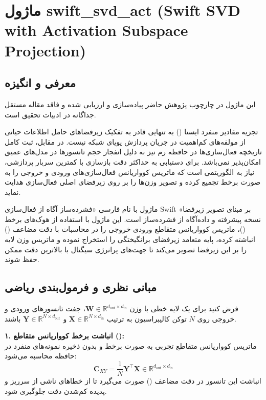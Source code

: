 \section{ماژول swift\_svd\_act (Swift SVD with Activation Subspace Projection)}
\label{sec:module_swift_svd_act}

\subsection{معرفی و انگیزه}
این ماژول در چارچوب پژوهش حاضر پیاده‌سازی و ارزیابی شده و فاقد مقاله مستقل جداگانه در ادبیات تحقیق است.

تجزیه مقادیر منفرد ایستا () به تنهایی قادر به تفکیک زیرفضاهای حامل اطلاعات حیاتی از مولفه‌های کم‌اهمیت در جریان پردازش پویای شبکه نیست. در مقابل، ثبت کامل تاریخچه فعال‌سازی‌ها در حافظه رم نیز به دلیل انفجار حجم تانسورها در مدل‌های عمیق امکان‌پذیر نمی‌باشد. برای دستیابی به حداکثر دقت بازسازی با کمترین سربار پردازشی، نیاز به الگوریتمی است که ماتریس کوواریانس فعال‌سازی‌های ورودی و خروجی را به صورت برخط تجمیع کرده و تصویر وزن‌ها را بر روی زیرفضای اصلی فعال‌سازی هدایت نماید.

ماژول  با نام فارسی «فشرده‌ساز آگاه از فعال‌سازی Swift بر مبنای تصویر زیرفضا» نسخه پیشرفته و داده‌آگاه از فشرده‌ساز  است. این ماژول با استفاده از هوک‌های برخط ()، ماتریس کوواریانس متقاطع ورودی-خروجی را در محاسبات با دقت مضاعف () انباشته کرده، پایه متعامد زیرفضای برانگیختگی را استخراج نموده و ماتریس وزن لایه را بر این زیرفضا تصویر می‌کند تا جهت‌های پرانرژی سیگنال با بالاترین دقت ممکن حفظ شوند.

\subsection{مبانی نظری و فرمول‌بندی ریاضی}
فرض کنید برای یک لایه خطی با وزن $\mathbf{W} \in \mathbb{R}^{d_{\text{out}} \times d_{\text{in}}}$، جفت تانسورهای ورودی و خروجی روی $N$ توکن کالیبراسیون به ترتیب $\mathbf{X} \in \mathbb{R}^{N \times d_{\text{in}}}$ و $\mathbf{Y} \in \mathbb{R}^{N \times d_{\text{out}}}$ باشند.

\textbf{۱. انباشت برخط کوواریانس متقاطع ():} \\
ماتریس کوواریانس متقاطع تجربی به صورت برخط و بدون ذخیره نمونه‌های منفرد در حافظه محاسبه می‌شود:
\begin{equation}
\mathbf{C}_{XY} = \frac{1}{N} \mathbf{Y}^\top \mathbf{X} \in \mathbb{R}^{d_{\text{out}} \times d_{\text{in}}}
\end{equation}
انباشت این تانسور در دقت مضاعف () صورت می‌گیرد تا از خطاهای ناشی از سرریز و پدیده کم‌شدن دقت جلوگیری شود.

